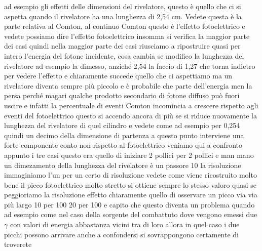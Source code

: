 ad esempio gli effetti delle dimensioni del rivelatore, questo è quello che ci si aspetta quando il rivelatore ha una lunghezza di 2,54 cm. Vedete questa è la parte relativa al Comton, al continuo Comton questo è l'effetto fotoelettrico e vedete possiamo dire l'effetto fotoelettrico insomma si verifica la maggior parte dei casi quindi nella maggior parte dei casi riusciamo a ripostruire quasi per intero l'energia del fotone incidente, cosa cambia se modifico la lunghezza del rivelatore ad esempio la dimesso, anziché 2,54 la faccio di 1,27 che torna indietro per vedere l'effetto e chiaramente succede quello che ci aspettiamo ma un rivelatore diventa sempre più piccolo e è probabile che parte dell'energia men la persa perché magari qualche prodotto secondario di fotone diffuso può fuori uscire e infatti la percentuale di eventi Comton incomincia a crescere rispetto agli eventi del fotoelettrico questo si accendo ancora di più se si riduce nuovamente la lunghezza del rivelatore di quel cilindro e vedete come ad esempio per 0,254 quindi un decimo della dimensione di partenza a questo punto interviene una forte componente conto non rispetto al fotoelettrico veniamo qui a confronto appunto i tre casi questo era quello di iniziare 2 pollici per 2 pollici e man mano un dimezamento della lunghezza del rivelatore è un passore 10 la risoluzione immaginiamo l'un per un certo di risoluzione vedete come viene ricostruito molto bene il picco fotoelettrico molto stretto si ottiene sempre lo stesso valoro quasi se peggioriamo la risoluzione effetto chiaramente quello di osservare un picco via via più largo 10 per 100 20 per 100 e capito che questo diventa un problema quando ad esempio come nel caso della sorgente del combattuto dove vengono emessi due $\gamma$ con valori di energia abbastanza vicini tra di loro allora in quel caso i due picchi possono arrivare anche a confondersi si sovrappongono certamente di troverete 

